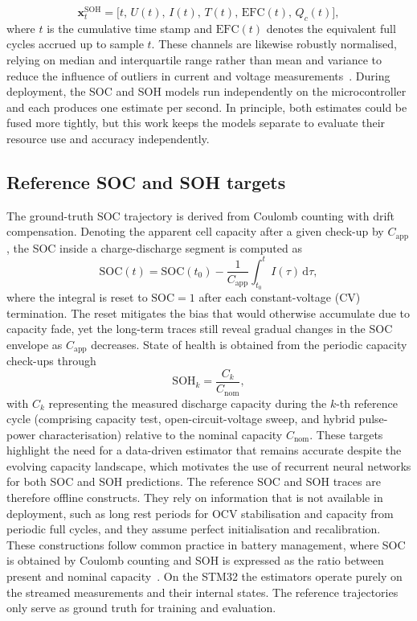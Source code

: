 \documentclass[review]{elsarticle}
\begin{document}
\begin{equation}
    \mathbf{x}^{\mathrm{SOH}}_t = \bigl[ t,\, U(t),\, I(t),\, T(t),\, \mathrm{EFC}(t),\, Q_c(t) \bigr],
\end{equation}
where $t$ is the cumulative time stamp and $\mathrm{EFC}(t)$ denotes the equivalent full cycles accrued up to sample $t$. These channels are likewise robustly normalised, relying on median and interquartile range rather than mean and variance to reduce the influence of outliers in current and voltage measurements~\cite{huberRobustStatistics2009,pedregosaScikitlearnMachineLearning2012}. During deployment, the SOC and SOH models run independently on the microcontroller and each produces one estimate per second. In principle, both estimates could be fused more tightly, but this work keeps the models separate to evaluate their resource use and accuracy independently.
\subsection{Reference SOC and SOH targets}
The ground-truth SOC trajectory is derived from Coulomb counting with drift compensation. Denoting the apparent cell capacity after a given check-up by $C_{\mathrm{app}}$, the SOC inside a charge-discharge segment is computed as
\begin{equation}
    \mathrm{SOC}(t) = \mathrm{SOC}(t_0) - \frac{1}{C_{\mathrm{app}}}\int_{t_0}^{t} I(\tau)\,\mathrm{d}\tau,
\end{equation}
where the integral is reset to $\mathrm{SOC}=1$ after each constant-voltage (CV) termination. The reset mitigates the bias that would otherwise accumulate due to capacity fade, yet the long-term traces still reveal gradual changes in the SOC envelope as $C_{\mathrm{app}}$ decreases.
State of health is obtained from the periodic capacity check-ups through
\begin{equation}
    \mathrm{SOH}_k = \frac{C_k}{C_{\mathrm{nom}}},
\end{equation}
with $C_k$ representing the measured discharge capacity during the $k$-th reference cycle (comprising capacity test, open-circuit-voltage sweep, and hybrid pulse-power characterisation) relative to the nominal capacity $C_{\mathrm{nom}}$. These targets highlight the need for a data-driven estimator that remains accurate despite the evolving capacity landscape, which motivates the use of recurrent neural networks for both SOC and SOH predictions.
The reference SOC and SOH traces are therefore offline constructs. They rely on information that is not available in deployment, such as long rest periods for OCV stabilisation and capacity from periodic full cycles, and they assume perfect initialisation and recalibration. These constructions follow common practice in battery management, where SOC is obtained by Coulomb counting and SOH is expressed as the ratio between present and nominal capacity~\cite{plettBatteryManagementSystems2015,a.m.s.m.h.s.attanayakaEstimationStateCharge2019,berecibarCriticalReviewState2016}. On the STM32 the estimators operate purely on the streamed measurements and their internal states. The reference trajectories only serve as ground truth for training and evaluation.
\end{document}
